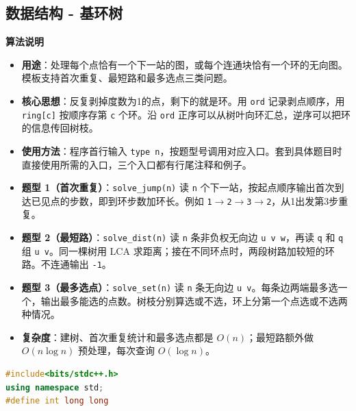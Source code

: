 \documentclass[10pt,landscape,a4paper]{article}
\begin{document}
\begin{multicols*}{3}
\subsection*{数据结构 - 基环树}
\par\addvspace{0.7ex}\noindent\textbf{算法说明}\par\nobreak
\begin{itemize}
\item \textbf{用途}：处理每个点恰有一个下一站的图，或每个连通块恰有一个环的无向图。模板支持首次重复、最短路和最多选点三类问题。
\item \textbf{核心思想}：反复剥掉度数为1的点，剩下的就是环。用 \texttt{o\allowbreak{}r\allowbreak{}d} 记录剥点顺序，用 \texttt{r\allowbreak{}i\allowbreak{}n\allowbreak{}g\allowbreak{}[\allowbreak{}c\allowbreak{}]} 按顺序存第 \texttt{c} 个环。沿 \texttt{o\allowbreak{}r\allowbreak{}d} 正序可以从树叶向环汇总，逆序可以把环的信息传回树枝。
\item \textbf{使用方法}：程序首行输入 \texttt{t\allowbreak{}y\allowbreak{}p\allowbreak{}e\allowbreak{} \allowbreak{}n}，按题型号调用对应入口。套到具体题目时直接使用所需的入口，三个入口都有行尾注释和例子。
\item \textbf{题型 1（首次重复）}：\texttt{s\allowbreak{}o\allowbreak{}l\allowbreak{}v\allowbreak{}e\allowbreak{}\_\allowbreak{}j\allowbreak{}u\allowbreak{}m\allowbreak{}p\allowbreak{}(\allowbreak{}n\allowbreak{})} 读 \texttt{n} 个下一站，按起点顺序输出首次到达已见点的步数，即到环步数加环长。例如 \texttt{1\allowbreak{}\ensuremath{\to}\allowbreak{}2\allowbreak{}\ensuremath{\to}\allowbreak{}3\allowbreak{}\ensuremath{\to}\allowbreak{}2}，从1出发第3步重复。
\item \textbf{题型 2（最短路）}：\texttt{s\allowbreak{}o\allowbreak{}l\allowbreak{}v\allowbreak{}e\allowbreak{}\_\allowbreak{}d\allowbreak{}i\allowbreak{}s\allowbreak{}t\allowbreak{}(\allowbreak{}n\allowbreak{})} 读 \texttt{n} 条非负权无向边 \texttt{u\allowbreak{} \allowbreak{}v\allowbreak{} \allowbreak{}w}，再读 \texttt{q} 和 \texttt{q} 组 \texttt{u\allowbreak{} \allowbreak{}v}。同一棵树用 LCA 求距离；接在不同环点时，两段树路加较短的环路。不连通输出 \texttt{-\allowbreak{}1}。
\item \textbf{题型 3（最多选点）}：\texttt{s\allowbreak{}o\allowbreak{}l\allowbreak{}v\allowbreak{}e\allowbreak{}\_\allowbreak{}s\allowbreak{}e\allowbreak{}t\allowbreak{}(\allowbreak{}n\allowbreak{})} 读 \texttt{n} 条无向边 \texttt{u\allowbreak{} \allowbreak{}v}。每条边两端最多选一个，输出最多能选的点数。树枝分别算选或不选，环上分第一个点选或不选两种情况。
\item \textbf{复杂度}：建树、首次重复统计和最多选点都是 $O(n)$；最短路额外做 $O(n\log n)$ 预处理，每次查询 $O(\log n)$。
\end{itemize}
\par{}\par
\begin{lstlisting}[language=C++]
#include<bits/stdc++.h>
using namespace std;
#define int long long


\end{lstlisting}
\end{multicols*}
\end{document}
